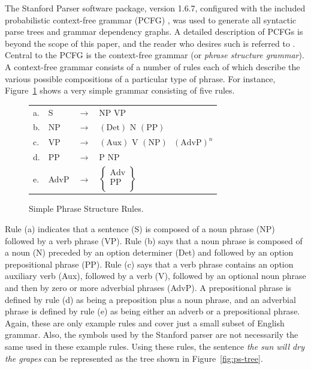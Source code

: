 \documentclass[main.tex]{subfiles}
\begin{document}
The Stanford Parser software package, version 1.6.7, configured with the included probabilistic context-free grammar (PCFG) \citep*{klein-manning-pcfg:2003}, was used to generate all syntactic parse trees and grammar dependency graphs. A detailed description of PCFGs is beyond the scope of this paper, and the reader who desires such is referred to \citet{booth:1973}. Central to the PCFG is the context-free grammar (or \textit{phrase structure grammar}). A context-free grammar consists of a number of rules each of which describe the various possible compositions of a particular type of phrase. For instance, Figure~\ref{fig:ps-rules} shows a very simple grammar consisting of five rules.
\begin{figure}
\centering
\begin{tabular}{l l l l}
a. & S & $\rightarrow$ & $\text{NP} \text{ VP}$\\ 
b. & NP & $\rightarrow$ & $(\text{Det}) \text{ N } (\text{PP})$\\
c. & VP & $\rightarrow$ & $(\text{Aux}) \text{ V } (\text{NP}) \text{ } (\text{AdvP})^n$\\
d. & PP & $\rightarrow$ & $\text{P } \text{NP}$\\
e. & AdvP &  $\rightarrow$ & $\begin{Bmatrix}
\text{Adv} \\ \text{PP} \\
\end{Bmatrix} $
\end{tabular}
\caption{Simple Phrase Structure Rules. \citep[Ch. 5.3]{akmajian:2010}}
\label{fig:ps-rules}
\end{figure}
Rule (a) indicates that a sentence (S) is composed of a noun phrase (NP) followed by a verb phrase (VP). Rule (b) says that a noun phrase is composed of a noun (N) preceded by an option determiner (Det) and followed by an option prepositional phrase (PP). Rule (c) says that a verb phrase contains an option auxiliary verb (Aux), followed by a verb (V), followed by an optional noun phrase and then by zero or more adverbial phrases (AdvP). A prepositional phrase is defined by rule (d) as being a preposition plus a noun phrase, and an adverbial phrase is defined by rule (e) as being either an adverb or a prepositional phrase. Again, these are only example rules and cover just a small subset of English grammar. Also, the symbols used by the Stanford parser are not necessarily the same used in these example rules. Using these rules, the sentence \textit{the sun will dry the grapes} can be represented as the tree shown in Figure~\ref{fig:ps-tree}.
\end{document}

